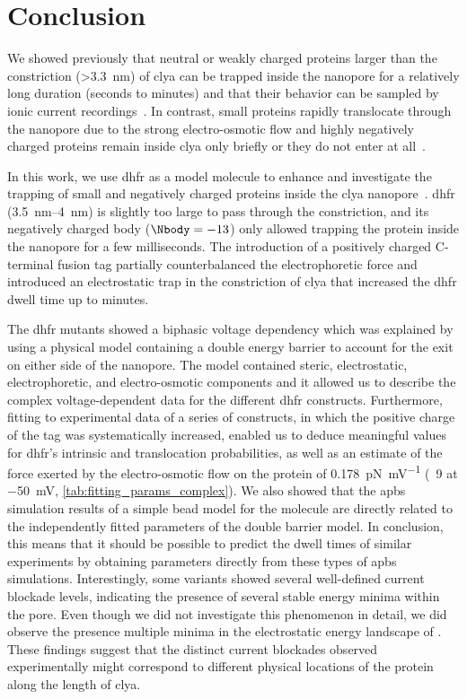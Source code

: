%
\section{Conclusion}
%
\label{sec:trapping:conclusion}
%
We showed previously that neutral or weakly charged proteins larger than the \transi{} constriction
(\SI{>3.3}{\nm}) of \gls{clya} can be trapped inside the nanopore for a relatively long duration (seconds to
minutes) and that their behavior can be sampled by ionic current recordings~\cite{Soskine-2013,
Soskine-2012,Soskine-Biesemans-2015,Biesemans-2015,VanMeervelt-2014,VanMeervelt-2017,Wloka-2017}. In contrast,
small proteins rapidly translocate through the nanopore due to the strong electro-osmotic flow and highly
negatively charged proteins remain inside \gls{clya} only briefly or they do not enter at
all~\cite{Soskine-2012}.

In this work, we use \gls{dhfr} as a model molecule to enhance and investigate the trapping of small and
negatively charged proteins inside the \gls{clya} nanopore~\cite{Biesemans-2015}. \gls{dhfr}
(\SIrange{3.5}{4}{\nm}) is slightly too large to pass through the \transi{} constriction, and its negatively
charged body ($\Nbody = -13$) only allowed trapping the protein inside the nanopore for a few milliseconds.
The introduction of a positively charged C-terminal fusion tag partially counterbalanced the electrophoretic
force and introduced an electrostatic trap in the \transi{} constriction of \gls{clya} that increased the
\gls{dhfr} dwell time up to minutes.

The \gls{dhfr} mutants showed a biphasic voltage dependency which was explained by using a physical model
containing a double energy barrier to account for the exit on either side of the nanopore. The model contained
steric, electrostatic, electrophoretic, and electro-osmotic components and it allowed us to describe the
complex voltage-dependent data for the different \gls{dhfr} constructs. Furthermore, fitting to experimental
data of a series of  constructs, in which the positive charge of the tag was systematically
increased, enabled us to deduce meaningful values for \gls{dhfr}'s intrinsic \cisi{} and \transi{}
translocation probabilities, as well as an estimate of the force exerted by the electro-osmotic flow on the
protein of \SI{0.178}{\pico\newton\per\milli\volt} (\eg~\SI{9}{\pN} at \SI{-50}{\mV},
\cref{tab:fitting_params_complex}). We also showed that the \gls{apbs} simulation results of a simple bead
model for the molecule are directly related to the independently fitted parameters of the double barrier
model. In conclusion, this means that it should be possible to predict the dwell times of similar experiments
by obtaining parameters directly from these types of \gls{apbs} simulations. Interestingly, some \DHFRt{}
variants showed several well-defined current blockade levels, indicating the presence of several stable energy
minima within the pore. Even though we did not investigate this phenomenon in detail, we did observe the
presence multiple minima in the electrostatic energy landscape of \DHFRt{}. These findings suggest that the
distinct current blockades observed experimentally might correspond to different physical locations of the
protein along the length of \gls{clya}.

